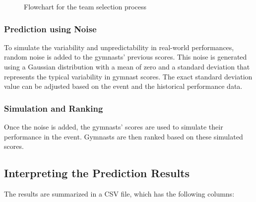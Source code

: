 \documentclass[11pt]{article}
\begin{document}
\begin{figure}[H]
\centering
{}
\caption{Flowchart for the team selection process}
\end{figure}

\subsubsection{Prediction using Noise}
To simulate the variability and unpredictability in real-world performances, random noise is added to the gymnasts' previous scores. This noise is generated using a Gaussian distribution with a mean of zero and a standard deviation that represents the typical variability in gymnast scores. The exact standard deviation value can be adjusted based on the event and the historical performance data.

\subsubsection{Simulation and Ranking}
Once the noise is added, the gymnasts' scores are used to simulate their performance in the event. Gymnasts are then ranked based on these simulated scores. 

\subsection{Interpreting the Prediction Results}
The results are summarized in a CSV file, which has the following columns:
\end{document}
